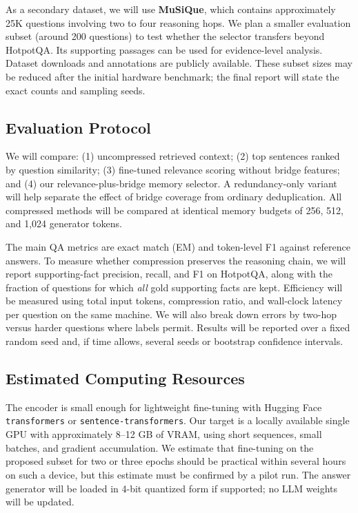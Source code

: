 \documentclass[11pt]{article}
\begin{document}
As a secondary dataset, we will use \textbf{MuSiQue}, which contains approximately 25K questions involving two to four reasoning hops. We plan a smaller evaluation subset (around 200 questions) to test whether the selector transfers beyond HotpotQA. Its supporting passages can be used for evidence-level analysis. Dataset downloads and annotations are publicly available. These subset sizes may be reduced after the initial hardware benchmark; the final report will state the exact counts and sampling seeds.

\subsection{Evaluation Protocol}

We will compare: (1) uncompressed retrieved context; (2) top sentences ranked by question similarity; (3) fine-tuned relevance scoring without bridge features; and (4) our relevance-plus-bridge memory selector. A redundancy-only variant will help separate the effect of bridge coverage from ordinary deduplication. All compressed methods will be compared at identical memory budgets of 256, 512, and 1,024 generator tokens.

The main QA metrics are exact match (EM) and token-level F1 against reference answers. To measure whether compression preserves the reasoning chain, we will report supporting-fact precision, recall, and F1 on HotpotQA, along with the fraction of questions for which \emph{all} gold supporting facts are kept. Efficiency will be measured using total input tokens, compression ratio, and wall-clock latency per question on the same machine. We will also break down errors by two-hop versus harder questions where labels permit. Results will be reported over a fixed random seed and, if time allows, several seeds or bootstrap confidence intervals.

\subsection{Estimated Computing Resources}

The encoder is small enough for lightweight fine-tuning with Hugging Face \texttt{transformers} or \texttt{sentence-transformers}. Our target is a locally available single GPU with approximately 8--12 GB of VRAM, using short sequences, small batches, and gradient accumulation. We estimate that fine-tuning on the proposed subset for two or three epochs should be practical within several hours on such a device, but this estimate must be confirmed by a pilot run. The answer generator will be loaded in 4-bit quantized form if supported; no LLM weights will be updated.
\end{document}

